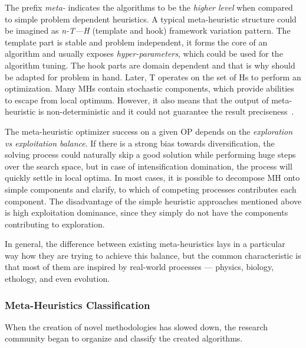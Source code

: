 The prefix \emph{meta-} indicates the algorithms to be the \textit{higher level} when compared to simple problem dependent heuristics. A typical meta-heuristic structure could be imagined as \emph{n-T—H} (template and hook) framework variation pattern. The template part is stable and problem independent, it forms the core of an algorithm and usually exposes \textit{hyper-parameters}, which could be used for the algorithm tuning. The hook parts are domain dependent and that is why should be adapted for problem in hand. Later, T operates on the set of Hs to perform an optimization.
Many MHs contain stochastic components, which provide abilities to escape from local optimum. However, it also means that the output of meta-heuristic is non-deterministic and it could not guarantee the result preciseness~\cite{boussaid2013survey}.

The meta-heuristic optimizer success on a given OP depends on the \textit{exploration vs exploitation balance}. If there is a strong bias towards diversification, the solving process could naturally skip a good solution while performing huge steps over the search space, but in case of intensification domination, the process will quickly settle in local optima. In most cases, it is possible to decompose MH onto simple components and clarify, to which of competing processes contributes each component. The disadvantage of the simple heuristic approaches mentioned above is high exploitation dominance, since they simply do not have the components contributing to exploration.

In general, the difference between existing meta-heuristics lays in a particular way how they are trying to achieve this balance, but the common characteristic is that most of them are inspired by real-world processes — physics, biology, ethology, and even evolution.


\subsubsection{Meta-Heuristics Classification}
When the creation of novel methodologies has slowed down, the research community began to organize and classify the created algorithms.

